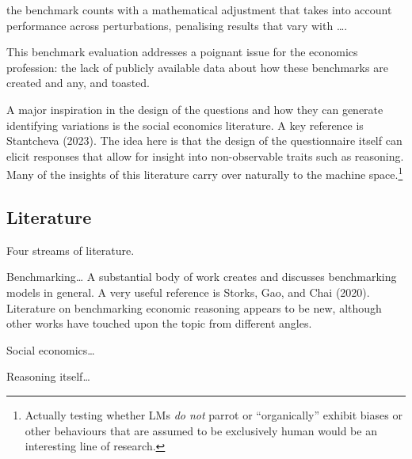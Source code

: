 \documentclass[
]{article}
\begin{document}
the benchmark counts with a mathematical adjustment that takes into
account performance across perturbations, penalising results that vary
with \ldots.

This benchmark evaluation addresses a poignant issue for the economics
profession: the lack of publicly available data about how these
benchmarks are created and any, and toasted.

A major inspiration in the design of the questions and how they can
generate identifying variations is the social economics literature. A
key reference is Stantcheva (2023). The idea here is that the design of
the questionnaire itself can elicit responses that allow for insight
into non-observable traits such as reasoning. Many of the insights of
this literature carry over naturally to the machine space.\footnote{Actually
  testing whether LMs \emph{do not} parrot or ``organically'' exhibit
  biases or other behaviours that are assumed to be exclusively human
  would be an interesting line of research.}

\subsection{Literature}\label{literature}

Four streams of literature.

Benchmarking\ldots{} A substantial body of work creates and discusses
benchmarking models in general. A very useful reference is Storks, Gao,
and Chai (2020). Literature on benchmarking economic reasoning appears
to be new, although other works have touched upon the topic from
different angles.

Social economics\ldots{}

Reasoning itself\ldots{}
\end{document}
